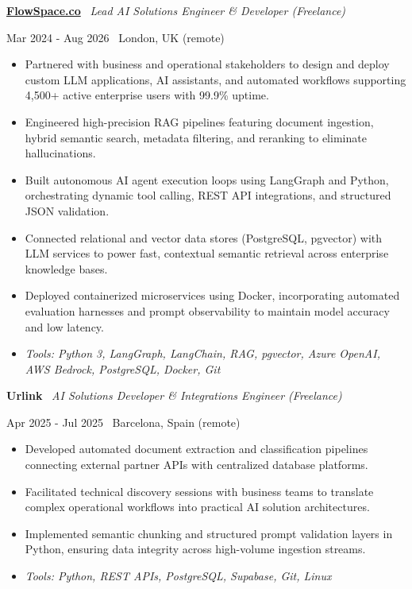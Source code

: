 \documentclass[a4paper,10pt]{article}
\newcommand{\role}[4]{%
  \vspace{2pt}\noindent
  \begin{minipage}[t]{0.70\textwidth}\raggedright\textbf{#1} \textbullet\ \textit{#3}\end{minipage}%
  \hfill
  \begin{minipage}[t]{0.28\textwidth}\raggedleft\footnotesize\color{gray}#2 \textbullet\ #4\end{minipage}%
  \vspace{1pt}%
}
\begin{document}
\role{\href{https://flowspace.co}{FlowSpace.co}}{Mar 2024 - Aug 2026}{Lead AI Solutions Engineer \& Developer (Freelance)}{London, UK (remote)}
\begin{itemize}
  \item Partnered with business and operational stakeholders to design and deploy custom LLM applications, AI assistants, and automated workflows supporting 4,500+ active enterprise users with 99.9\% uptime.
  \item Engineered high-precision RAG pipelines featuring document ingestion, hybrid semantic search, metadata filtering, and reranking to eliminate hallucinations.
  \item Built autonomous AI agent execution loops using LangGraph and Python, orchestrating dynamic tool calling, REST API integrations, and structured JSON validation.
  \item Connected relational and vector data stores (PostgreSQL, pgvector) with LLM services to power fast, contextual semantic retrieval across enterprise knowledge bases.
  \item Deployed containerized microservices using Docker, incorporating automated evaluation harnesses and prompt observability to maintain model accuracy and low latency.
  \item \textit{Tools: Python 3, LangGraph, LangChain, RAG, pgvector, Azure OpenAI, AWS Bedrock, PostgreSQL, Docker, Git}
\end{itemize}

\role{Urlink}{Apr 2025 - Jul 2025}{AI Solutions Developer \& Integrations Engineer (Freelance)}{Barcelona, Spain (remote)}
\begin{itemize}
  \item Developed automated document extraction and classification pipelines connecting external partner APIs with centralized database platforms.
  \item Facilitated technical discovery sessions with business teams to translate complex operational workflows into practical AI solution architectures.
  \item Implemented semantic chunking and structured prompt validation layers in Python, ensuring data integrity across high-volume ingestion streams.
  \item \textit{Tools: Python, REST APIs, PostgreSQL, Supabase, Git, Linux}
\end{itemize}
\end{document}
